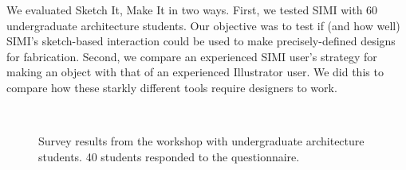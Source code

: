 \documentclass{article}
\begin{document}
We evaluated Sketch It, Make It in two ways. First, we tested SIMI
with 60 undergraduate architecture students. Our objective was to test
if (and how well) SIMI's sketch-based interaction could be used to
make precisely-defined designs for fabrication. Second, we compare an
experienced SIMI user's strategy for making an object with that of an
experienced Illustrator user. We did this to compare how these starkly
different tools require designers to work.

\begin{figure}[t]
\centering {}
\\
\caption{Survey results from the workshop with undergraduate
  architecture students. 40 students responded to the questionnaire.}

\label{fig:survey}
\end{figure}
\end{document}
